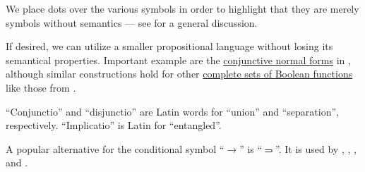 \begin{comments}
  \item We place dots over the various symbols in order to highlight that they are merely symbols without semantics --- see  for a general discussion.

  \item If desired, we can utilize a smaller propositional language without losing its semantical properties. Important example are the \hyperref[def:cnf_and_dnf]{conjunctive normal forms} in , although similar constructions hold for other \hyperref[def:boolean_closure/complete]{complete sets of Boolean functions} like those from .

  \item \enquote{Conjunctio} and \enquote{disjunctio} are Latin words for \enquote{union} and \enquote{separation}, respectively. \enquote{Implicatio} is Latin for \enquote{entangled}.

  \item A popular alternative for the conditional symbol \enquote{\( \rightarrow \)} is \enquote{\( \rightimply \)}. It is used by , , ,  and .
\end{comments}

